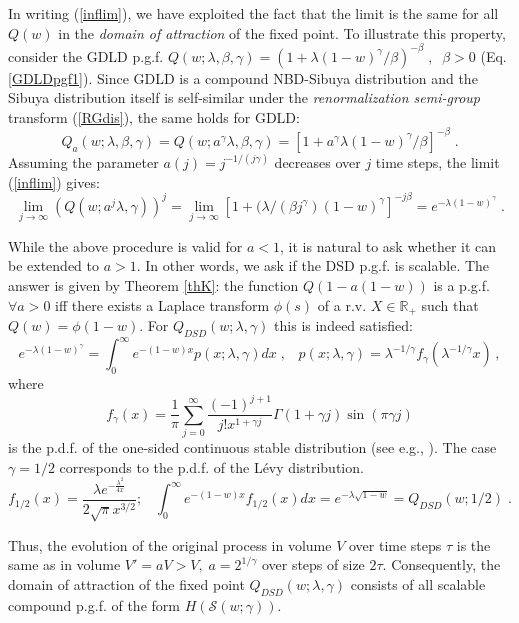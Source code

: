 \documentclass[a4paper,12pt]{amsart}
\newcommand{\R}{\mathbb{R}_{+}}
\theoremstyle{definition}
\theoremstyle{remark}
\begin{document}
In writing  (\ref{inflim}), we have exploited the fact that the limit is the same for all $Q(w)$ in the {\it domain of attraction} of the fixed point. To illustrate this property, consider the GDLD p.g.f. $Q(w;\lambda,\beta,\gamma)=(1+\lambda(1-w)^{\gamma}/\beta)^{-\beta}\;,\;\;\beta>0$ (Eq.\ref{GDLDpgf1}).
Since GDLD is a compound NBD-Sibuya distribution and the Sibuya distribution itself is self-similar under the {\it renormalization semi-group} transform (\ref{RGdis}), the same holds for GDLD:
\[
Q_a(w;\lambda,\beta,\gamma ) = Q(w;a^{\gamma}\lambda,\beta, \gamma) = \left[1+a^{\gamma}\lambda(1-w)^{\gamma}/\beta\right]^{-\beta}\;.
\]
Assuming the parameter $a(j)=j^{-1/(j \gamma)}$ decreases over $j$ time steps, the limit  (\ref{inflim}) gives:
\[ \lim_{j \to\infty} (Q(w;a^j\lambda,\gamma))^j=
\lim_{j \to\infty}\left[1+(\lambda/(\beta j^{\gamma})(1-w)^{\gamma}\right]^{-j \beta} = e^{-\lambda(1-w)^{\gamma}}\;.
\]

While the above procedure is valid for $a<1$, it is natural to ask whether it can be extended to $a>1$. In other words, we ask if the DSD p.g.f. is scalable. The answer is given by Theorem \ref{thK}: the function $Q(1-a(1-w))$ is a p.g.f. $\forall a>0$ iff there exists a Laplace transform $\phi(s)$ of a r.v. $X\in \R$  such that $Q(w)=\phi(1-w)$. For $Q_{DSD}(w;\lambda,\gamma)$ this is indeed satisfied:
\begin{equation}
\label{eq: Pollard1}
e^{-\lambda(1-w)^{\gamma}}= \int_0^\infty e^{-(1-w)x}p(x;\lambda,\gamma) dx\;,\;\;\; p(x;\lambda,\gamma)=\lambda^{-1/\gamma}f_{\gamma}(\lambda^{-1/\gamma}x)\, ,
\end{equation}
where 
$$f_{\gamma}(x)=\frac{1}{\pi} \sum^{\infty}_{j=0}\frac{(-1)^{j+1}}{j!x^{1+\gamma j}}\Gamma(1\!+\!\gamma j)\sin(\pi\gamma j)$$
is the p.d.f. of the one-sided continuous stable distribution (see e.g., \cite{Penson2010}). The case $\gamma=1/2$ corresponds to the p.d.f. of the L\'{e}vy distribution.
\begin{equation}\label{levy}
    f_{1/2}(x)= \frac{\lambda e^{-\frac{\lambda^2}{4 x}}}{2\sqrt{\pi } x^{3/2}};\;\;\;
\int_0^\infty e^{-(1-w)x}f_{1/2}(x) dx = e^{-\lambda \sqrt{1-w}}=Q_{DSD}(w;1/2)\;.
\end{equation}

Thus, the evolution of the original process in volume $V$ over time steps $\tau$ is the same as in volume $V'=aV>V,\;a=2^{1/\gamma}$  over steps of size $2\tau$. Consequently, the domain of attraction of the fixed point $Q_{DSD}(w;\lambda,\gamma)$ consists of all scalable compound p.g.f. of the form $H(\mathcal{S}(w;\gamma))$. 
\end{document}
